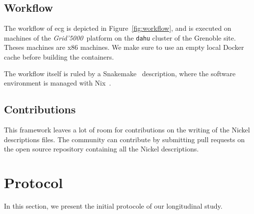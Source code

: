 \documentclass[sigconf,natbib=false]{acmart}
\newcommand{\grid}{\emph{Grid'5000}}
\newcommand{\df}{\texttt{Dockerfile}}
\newcommand{\ecg}{\texttt{ecg}}
\begin{document}
\subsection{Workflow}\label{sec:workflow}

\begin{figure*}
  \centering
  \caption{
    Workflow of \ecg.
    Each description of an artifact is verified with the Nickel contract and then converted in a JSON representation.
    This JSON representation is then read by \ecg\ to
    \textit{(i)} download the artifact,
    \textit{(ii)} compute the hash of its content,
    \textit{(iii)} build the container from the \df, and
    \textit{(iv)} extract the software environment information from the built container.
    \ecg\ outputs files containing the information about the artifact and its \df\ .
  }
  \label{fig:workflow}
\end{figure*}

The workflow of ecg is depicted in Figure~\ref{fig:workflow}, and is executed on machines of the \grid\ platform \cite{grid5000} on the \texttt{dahu} cluster of the Grenoble site.
Theses machines are x86 machines.
We make sure to use an empty local Docker cache before building the containers.

The workflow itself is ruled by a Snakemake~\cite{koster2012snakemake} description, where the software environment is managed with Nix~\cite{dolstra_nix_2004}.

\subsection{Contributions}

This framework leaves a lot of room for contributions on the writing of the Nickel descriptions files.
The community can contribute by submitting pull requests on the open source repository containing all the Nickel descriptions.

\section{Protocol}\label{sec:protocol}

In this section, we present the initial protocole of our longitudinal study.
\end{document}
